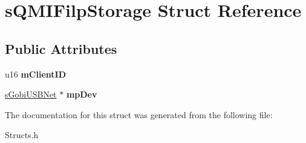 \hypertarget{structsQMIFilpStorage}{\section{s\-Q\-M\-I\-Filp\-Storage \-Struct \-Reference}
\label{structsQMIFilpStorage}
}
\subsection*{\-Public \-Attributes}
\begin{DoxyCompactItemize}
\item 
\hypertarget{structsQMIFilpStorage_a3abedb922c1cf68694685c66dd64fc1e}{u16 {\bfseries m\-Client\-I\-D}}\label{structsQMIFilpStorage_a3abedb922c1cf68694685c66dd64fc1e}

\item 
\hypertarget{structsQMIFilpStorage_a374e15415e9d966ca4e98942818e4b1c}{\hyperlink{structsGobiUSBNet}{s\-Gobi\-U\-S\-B\-Net} $\ast$ {\bfseries mp\-Dev}}\label{structsQMIFilpStorage_a374e15415e9d966ca4e98942818e4b1c}

\end{DoxyCompactItemize}


\-The documentation for this struct was generated from the following file\-:\begin{DoxyCompactItemize}
\item 
\-Structs.\-h\end{DoxyCompactItemize}
